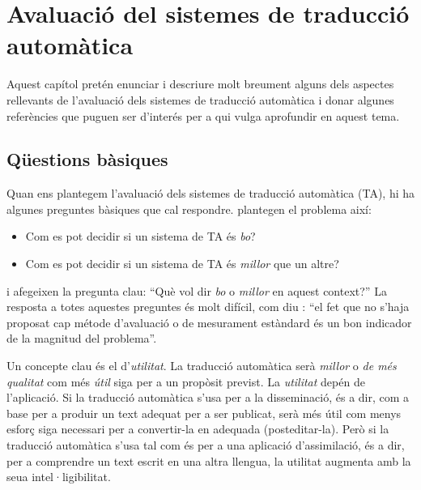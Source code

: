 \chapter{Avaluació del sistemes de traducció automàtica}
\label{se:ASTA}

Aquest capítol pretén enunciar i descriure molt breument alguns dels
aspectes rellevants de l'avaluació dels sistemes de traducció
automàtica i donar algunes referències que puguen ser d'interés per a
qui vulga aprofundir en aquest tema.

\section{Qüestions bàsiques} 
Quan ens plantegem l'avaluació dels sistemes de traducció automàtica
(TA), hi ha algunes preguntes bàsiques que cal
respondre. \citet{arnold94b} plantegen el problema així:
\begin{itemize}
\item Com es pot decidir si un sistema de TA és \emph{bo}?
\item Com es pot decidir si un sistema de TA és \emph{millor} que un
  altre?
\end{itemize}
i afegeixen la pregunta clau: ``Què vol dir \emph{bo} o \emph{millor}
en aquest context?'' La resposta a totes aquestes preguntes és molt
difícil, com diu \citet{minnis94j}: ``el fet que no s'haja proposat
cap métode d'avaluació o de mesurament estàndard és un bon indicador
de la magnitud del problema''.

Un concepte clau és el d'\emph{utilitat}. La traducció automàtica serà
\emph{millor} o \emph{de més qualitat} com més \emph{útil} siga per a
un propòsit previst. La \emph{utilitat} depén de l'aplicació. Si la
traducció automàtica s'usa per a la disseminació, és a dir, com a base
per a produir un text adequat per a ser publicat, serà més útil com
menys esforç siga necessari per a convertir-la en adequada
(posteditar-la). Però si la traducció automàtica s'usa tal com és per
a una aplicació d'assimilació, és a dir, per a comprendre un text
escrit en una altra llengua, la utilitat augmenta amb la seua
intel·ligibilitat.

